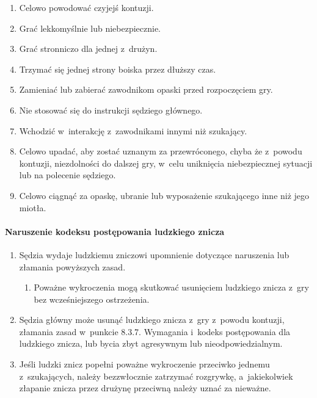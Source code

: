 \documentclass[12pt]{article}
\begin{document}
\begin{enumerate}
	\item Celowo powodować czyjejś kontuzji.

	\item Grać lekkomyślnie lub niebezpiecznie.

	\item Grać stronniczo dla jednej z~drużyn.

	\item Trzymać się jednej strony boiska przez dłuższy czas.

	\item Zamieniać lub zabierać zawodnikom opaski przed rozpoczęciem gry.

	\item Nie stosować się do instrukcji sędziego głównego.

	\item Wchodzić w~interakcję z~zawodnikami innymi niż szukający.

	\item Celowo upadać, aby zostać uznanym za przewróconego, chyba że z~powodu
	      kontuzji, niezdolności do dalszej gry, w~celu uniknięcia niebezpiecznej
	      sytuacji lub na polecenie sędziego.

	\item Celowo ciągnąć za opaskę, ubranie lub wyposażenie szukającego inne
	      niż jego miotła.
\end{enumerate}

\paragraph{Naruszenie kodeksu postępowania ludzkiego znicza}

\begin{enumerate}
	\item Sędzia wydaje ludzkiemu zniczowi upomnienie dotyczące naruszenia lub
	      złamania powyższych zasad.
	      \begin{enumerate}
		      \item Poważne wykroczenia mogą skutkować usunięciem ludzkiego znicza z~gry
		            bez wcześniejszego ostrzeżenia.
	      \end{enumerate}

	\item Sędzia główny może usunąć ludzkiego znicza z~gry z~powodu kontuzji,
	      złamania zasad w~punkcie 8.3.7. Wymagania i~kodeks postępowania dla
	      ludzkiego znicza, lub bycia zbyt agresywnym lub nieodpowiedzialnym.

	\item Jeśli ludzki znicz popełni poważne wykroczenie przeciwko jednemu z~szukających, należy bezzwłocznie zatrzymać rozgrywkę, a~jakiekolwiek
	      złapanie znicza przez drużynę przeciwną należy uznać za nieważne.
\end{enumerate}
\end{document}
